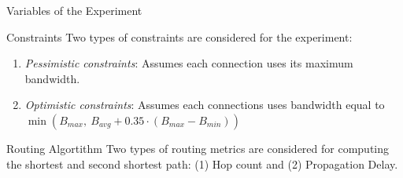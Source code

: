 \begin{section}{Variables of the Experiment}
    \begin{subsection}{Constraints}
        Two types of constraints are considered for the experiment:
        \begin{enumerate}
            \item \textit{Pessimistic constraints}: Assumes each connection uses its maximum bandwidth.
            \item \textit{Optimistic constraints}: Assumes each connections uses bandwidth equal to \\ $\min\left(B_{max},\ B_{avg} + 0.35 \cdot (B_{max} - B_{min}) \right)$
        \end{enumerate}
    \end{subsection}

    \begin{subsection}{Routing Algortithm}
        Two types of routing metrics are considered for computing the shortest and second shortest path: (1) Hop count and (2) Propagation Delay.
    \end{subsection}

\end{section}

